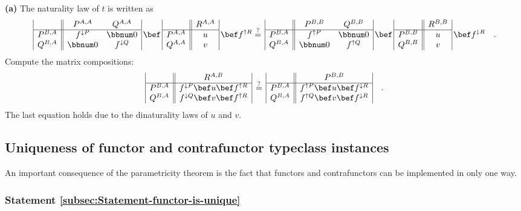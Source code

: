 \textbf{(a)} The naturality law of $t$ is written as
\[
\begin{array}{|c||cc|}
 & P^{A,A} & Q^{A,A}\\
\hline P^{B,A} & f^{\downarrow P} & \bbnum 0\\
Q^{B,A} & \bbnum 0 & f^{\downarrow Q}
\end{array}\,\bef\,\begin{array}{|c||c|}
 & R^{A,A}\\
\hline P^{A,A} & u\\
Q^{A,A} & v
\end{array}\,\bef f^{\uparrow R}\overset{?}{=}\,\begin{array}{|c||cc|}
 & P^{B,B} & Q^{B,B}\\
\hline P^{B,A} & f^{\uparrow P} & \bbnum 0\\
Q^{B,A} & \bbnum 0 & f^{\uparrow Q}
\end{array}\,\bef\,\begin{array}{|c||c|}
 & R^{B,B}\\
\hline P^{B,B} & u\\
Q^{B,B} & v
\end{array}\,\bef f^{\downarrow R}\quad.
\]
Compute the matrix compositions:
\[
\begin{array}{|c||c|}
 & R^{A,B}\\
\hline P^{B,A} & f^{\downarrow P}\bef u\bef f^{\uparrow R}\\
Q^{B,A} & f^{\downarrow Q}\bef v\bef f^{\uparrow R}
\end{array}\,\overset{?}{=}\,\begin{array}{|c||c|}
 & P^{B,B}\\
\hline P^{B,A} & f^{\uparrow P}\bef u\bef f^{\downarrow R}\\
Q^{B,A} & f^{\uparrow Q}\bef v\bef f^{\downarrow R}
\end{array}\quad.
\]
The last equation holds due to the dinaturality laws of $u$ and $v$.

\subsection{Uniqueness of functor and contrafunctor typeclass instances\label{sec:Uniqueness-of-functor-and-contrafunctor}}

An important consequence of the parametricity theorem is the fact
that functors and contrafunctors can be implemented in only one way.

\subsubsection{Statement \label{subsec:Statement-functor-is-unique}\ref{subsec:Statement-functor-is-unique}}

